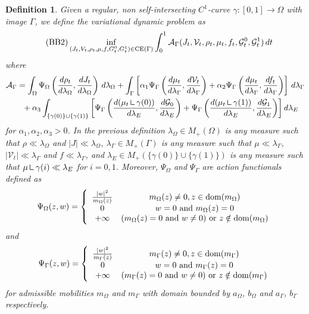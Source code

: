 \documentclass{article}
\def\calA{{\mathcal A}} \def\calB{{\mathcal B}} \def\calC{{\mathcal C}}
\newcommand{\mres}{\mathbin{\vrule height 1.4ex depth 0pt width
0.13ex\vrule height 0.13ex depth 0pt width 1.0ex}}
\newtheorem{definition}[theorem]{Definition}
\begin{document}
\begin{definition}\label{def:adm_mobility}
Given a regular, non self-intersecting $C^1$-curve $\gamma : [0,1] \rightarrow \Omega$ with image $\Gamma$, we define the variational dynamic problem as 
    \begin{align}\label{eq:BB2}\tag{BB2}
& \inf_{(J_t, V_t, \rho_t, \mu, f, G_t^0, G_t^1) \in {\rm CE}(\Gamma)}  \int_0^1 \calA_\Gamma(J_t, \mathcal{V}_t, \rho_t, \mu_t, f_t, \mathcal{G}_t^0, \mathcal{G}_t^1)\, dt
\end{align}
where 
\begin{align}\label{eq:actionformula}
& \calA_\Gamma = \int_{\Omega}\Psi_\Omega\left(\frac{d\rho_t}{d\lambda_\Omega}, \frac{dJ_t}{d\lambda_\Omega} \right) \, d\lambda_\Omega 
+ \int_{\Gamma}\left[ \alpha_1\Psi_\Gamma\left(\frac{d\mu_t}{d\lambda_\Gamma},\frac{d\mathcal{V}_t}{d\lambda_\Gamma}\right) + \alpha_2\Psi_\Gamma\left(\frac{d\mu_t}{d\lambda_\Gamma}, \frac{df_t}{d\lambda_\Gamma}\right)\right]\,d\lambda_\Gamma\\
& \qquad + \alpha_3 \int_{\{\gamma(0)\} \cup \{\gamma(1)\}}\left[\Psi_\Gamma\left(\frac{d(\mu_t \mres\gamma(0))}{d\lambda_E},\frac{d\mathcal{G}_0}{d\lambda_E}\right) +\Psi_\Gamma\left(\frac{d(\mu_t \mres  \gamma(1))}{d\lambda_E},\frac{d\mathcal{G}_1}{d\lambda_E}\right)\right] d\lambda_E\nonumber
\end{align}
for $\alpha_1, \alpha_2, \alpha_3 > 0 $. In the previous definition $\lambda_\Omega \in M_+(\Omega)$ is any measure such that $\rho \ll \lambda_\Omega$ and $|J| \ll \lambda_\Omega$, $\lambda_\Gamma \in M_+(\Gamma)$ is any measure such that $\mu \ll \lambda_\Gamma$, $|\mathcal{V}_t| \ll \lambda_\Gamma$ and $f \ll \lambda_\Gamma$, and $\lambda_E \in M_+(\{\gamma(0)\} \cup \{\gamma(1)\})$ is any measure such that $\mu \mres  \gamma(i) \ll \lambda_E$ for $i=0,1$.  
Moreover, $\Psi_\Omega$ and $\Psi_\Gamma$ are action functionals defined as
\begin{align}
    \Psi_\Omega(z,w) = \left\{
    \begin{array}{cc}
         \frac{|w|^2}{m_\Omega(z)}& m_\Omega(z) \neq 0, z \in {\rm dom}(m_\Omega)  \\
         0 & w = 0 \text{ and } m_\Omega(z) = 0\\
         +\infty & (m_\Omega(z) = 0 \text{ and} \ w \neq 0) \text{ or } z \notin {\rm dom}(m_\Omega)
    \end{array}
    \right.
\end{align}
and
\begin{align}
    \Psi_\Gamma(z,w) = \left\{
    \begin{array}{cc}
         \frac{|w|^2}{m_\Gamma(z)}& m_\Gamma(z) \neq 0, z \in {\rm dom}(m_\Gamma)   \\
         0 & w = 0 \text{ and } m_\Gamma(z) = 0 \\
         +\infty &  (m_\Gamma(z) = 0 \text{ and} \ w \neq 0) \text{ or } z \notin {\rm dom}(m_\Gamma)
    \end{array}
    \right.
\end{align}
for admissible mobilities $m_\Omega$ and $m_\Gamma$ with domain bounded by $a_\Omega$, $b_\Omega$ and $a_\Gamma$, $b_\Gamma$ respectively.
\end{definition}
\end{document}
